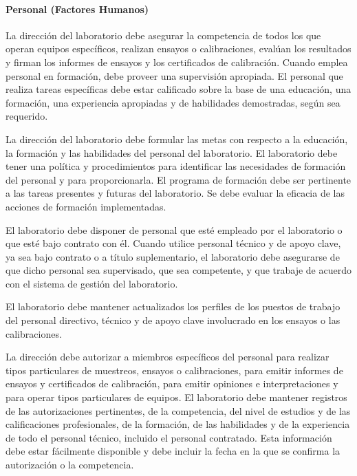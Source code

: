 \newpage
\thispagestyle{plain}
		
		\paragraph{Personal (Factores Humanos)}
			\par 
				La dirección del laboratorio debe asegurar la competencia de todos los que operan equipos
				específicos, realizan ensayos o calibraciones, evalúan los resultados y firman los informes de ensayos y los
				certificados de calibración. Cuando emplea personal en formación, debe proveer una supervisión apropiada.
				El personal que realiza tareas específicas debe estar calificado sobre la base de una educación, una
				formación, una experiencia apropiadas y de habilidades demostradas, según sea requerido.
			
			\par \noindent
				La dirección del laboratorio debe formular las metas con respecto a la educación, la formación y las
				habilidades del personal del laboratorio. El laboratorio debe tener una política y procedimientos para
				identificar las necesidades de formación del personal y para proporcionarla. El programa de formación debe
				ser pertinente a las tareas presentes y futuras del laboratorio. Se debe evaluar la eficacia de las acciones de
				formación implementadas.
				
			\par \noindent
				El laboratorio debe disponer de personal que esté empleado por el laboratorio o que esté bajo
				contrato con él. Cuando utilice personal técnico y de apoyo clave, ya sea bajo contrato o a título
				suplementario, el laboratorio debe asegurarse de que dicho personal sea supervisado, que sea competente, y
				que trabaje de acuerdo con el sistema de gestión del laboratorio.
				
			\par \noindent
				El laboratorio debe mantener actualizados los perfiles de los puestos de trabajo del personal directivo,
				técnico y de apoyo clave involucrado en los ensayos o las calibraciones.
				
			\par \noindent
				La dirección debe autorizar a miembros específicos del personal para realizar tipos particulares
				de muestreos, ensayos o calibraciones, para emitir informes de ensayos y certificados de calibración, para
				emitir opiniones e interpretaciones y para operar tipos particulares de equipos. El laboratorio debe mantener
				registros de las autorizaciones pertinentes, de la competencia, del nivel de estudios y de las calificaciones
				profesionales, de la formación, de las habilidades y de la experiencia de todo el personal técnico, incluido el
				personal contratado. Esta información debe estar fácilmente disponible y debe incluir la fecha en la que se
				confirma la autorización o la competencia.
				
